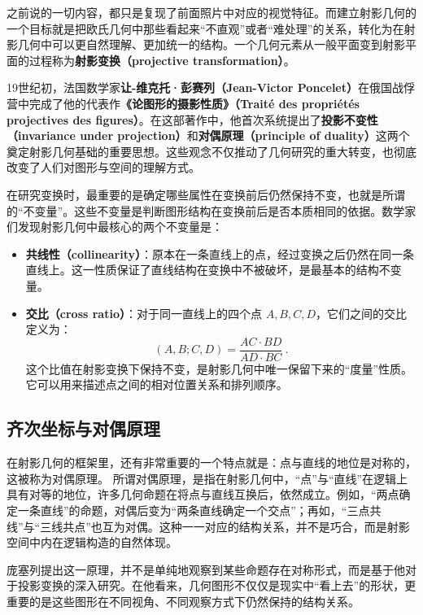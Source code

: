 之前说的一切内容，都只是复现了前面照片中对应的视觉特征。而建立射影几何的一个目标就是把欧氏几何中那些看起来“不直观”或者“难处理”的关系，转化为在射影几何中可以更自然理解、更加统一的结构。一个几何元素从一般平面变到射影平面的过程称为\textbf{射影变换（projective transformation）}。

19世纪初，法国数学家\textbf{让-维克托·彭赛列（Jean-Victor Poncelet）}在俄国战俘营中完成了他的代表作\textbf{《论图形的摄影性质》（Traité des propriétés projectives des figures）}。在这部著作中，他首次系统提出了\textbf{投影不变性（invariance under projection）}和\textbf{对偶原理（principle of duality）}这两个奠定射影几何基础的重要思想。这些观念不仅推动了几何研究的重大转变，也彻底改变了人们对图形与空间的理解方式。

在研究变换时，最重要的是确定哪些属性在变换前后仍然保持不变，也就是所谓的“不变量”。这些不变量是判断图形结构在变换前后是否本质相同的依据。数学家们发现射影几何中最核心的两个不变量是：
\begin{itemize}
\item \textbf{共线性（collinearity）}：原本在一条直线上的点，经过变换之后仍然在同一条直线上。这一性质保证了直线结构在变换中不被破坏，是最基本的结构不变量。
\item \textbf{交比（cross ratio）}：对于同一直线上的四个点 $A, B, C, D$，它们之间的交比定义为：
\begin{equation}
(A, B; C, D) = \frac{AC \cdot BD}{AD \cdot BC}~.
\end{equation}
这个比值在射影变换下保持不变，是射影几何中唯一保留下来的“度量”性质。它可以用来描述点之间的相对位置关系和排列顺序。
\end{itemize}


\subsection{齐次坐标与对偶原理}

在射影几何的框架里，还有非常重要的一个特点就是：点与直线的地位是对称的，这被称为对偶原理。
所谓对偶原理，是指在射影几何中，“点”与“直线”在逻辑上具有对等的地位，许多几何命题在将点与直线互换后，依然成立。例如，“两点确定一条直线”的命题，对偶后变为“两条直线确定一个交点”；再如，“三点共线”与“三线共点”也互为对偶。这种一一对应的结构关系，并不是巧合，而是射影空间中内在逻辑构造的自然体现。



庞塞列提出这一原理，并不是单纯地观察到某些命题存在对称形式，而是基于他对于投影变换的深入研究。在他看来，几何图形不仅仅是现实中“看上去”的形状，更重要的是这些图形在不同视角、不同观察方式下仍然保持的结构关系。

